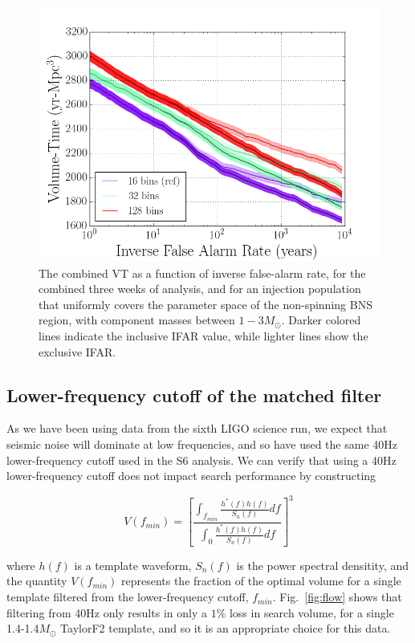 \begin{figure}
\centering
\includegraphics[width=1.0\textwidth]{papers/bns_o1_dev/figures/chisq_combined.png}
\caption{\label{fig:fchisq} 
The combined VT as a function of inverse false-alarm rate, for the combined three weeks of analysis, and for an injection population that uniformly covers the parameter space of the non-spinning BNS region, with component masses between $1- 3M_\odot$. Darker colored lines indicate the inclusive IFAR value, while lighter lines show the exclusive IFAR. 
}
\end{figure}

\subsection{Lower-frequency cutoff of the matched filter}

As we have been using data from the sixth LIGO science run, we expect that seismic noise will dominate at low frequencies, and so have used the same 40Hz lower-frequency cutoff used in the S6 analysis. We can verify that using a 40Hz lower-frequency cutoff does not impact search performance by constructing

\begin{equation}
V(f_{min}) = \left[ \frac{\int_{f_{min}} \frac{h^{*}(f)h(f)}{S_n(f)} df}{\int_{0} \frac{h^*(f)h(f)}{S_n(f)} df} \right]^3
\end{equation}

where $h(f)$ is a template waveform, $S_n(f)$ is the power spectral densitity, and the quantity $V(f_{min})$ represents the fraction of the optimal volume for a single template
filtered from the lower-frequency cutoff, $f_{min}$. Fig.~\ref{fig:flow} shows that filtering from 40Hz only results in only a $1\%$ loss in search volume, for a single 1.4-1.4$M_\odot$ TaylorF2 template, and so it is an appropriate choice for this data.


